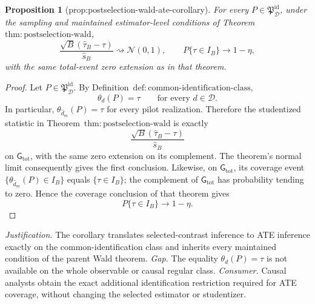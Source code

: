 \documentclass{article}
\newtheorem{proposition}{Proposition}
\begin{document}
\begin{proposition}[prop:postselection-wald-ate-corollary]\label{prop:postselection-wald-ate-corollary}
For every \(P\in\mathfrak P_{\mathcal D}^{\mathrm{id}}\), under the sampling and maintained estimator-level conditions of Theorem~\(\mathrm{thm{:}postselection\text{-}wald}\),
\[
 \frac{\sqrt B(\widehat\tau_B-\tau)}{\widehat s_B}
 \rightsquigarrow\mathcal N(0,1),
 \qquad
 P\{\tau\in I_B\}\longrightarrow1-\eta,
\]
with the same total-event zero extension as in that theorem.
\end{proposition}
\begin{proof}
Let \(P\in\mathfrak P_{\mathcal D}^{\mathrm{id}}\).  By Definition~\(\mathrm{def{:}common\text{-}identification\text{-}class}\),
\[
 \theta_d(P)=\tau\qquad\text{for every }d\in\mathcal D.
\]
In particular, \(\theta_{\widehat d_m}(P)=\tau\) for every pilot realization.  Therefore the studentized statistic in Theorem~\(\mathrm{thm{:}postselection\text{-}wald}\) is exactly
\[
 \frac{\sqrt B(\widehat\tau_B-\tau)}{\widehat s_B}
\]
on \(\mathsf G_{\mathrm{tot}}\), with the same zero extension on its complement.  The theorem's normal limit consequently gives the first conclusion.  Likewise, on \(\mathsf G_{\mathrm{tot}}\), its coverage event \(\{\theta_{\widehat d_m}(P)\in I_B\}\) equals \(\{\tau\in I_B\}\); the complement of \(\mathsf G_{\mathrm{tot}}\) has probability tending to zero.  Hence the coverage conclusion of that theorem gives
\[
 P\{\tau\in I_B\}\longrightarrow1-\eta.
\]
\end{proof}
\par\smallskip\noindent \textit{Justification.} The corollary translates selected-contrast inference to ATE inference exactly on the common-identification class and inherits every maintained condition of the parent Wald theorem. \textit{Gap.} The equality \(\theta_d(P)=\tau\) is not available on the whole observable or causal regular class. \textit{Consumer.} Causal analysts obtain the exact additional identification restriction required for ATE coverage, without changing the selected estimator or studentizer.
\end{document}

